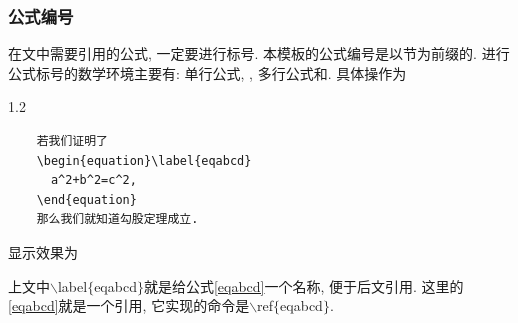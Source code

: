 \documentclass[a4paper,12pt,twoside]{ctexart}
\begin{document}
    \subsubsection{公式编号}
    在文中需要引用的公式, 一定要进行标号. 本模板的公式编号是以节为前缀的. 进行公式标号的数学环境主要有: 单行公式, , 多行公式和. 具体操作为
    \begin{spacing}{1.2}
    \begin{verbatim}
    若我们证明了
    \begin{equation}\label{eqabcd}
      a^2+b^2=c^2,
    \end{equation}
    那么我们就知道勾股定理成立.
    \end{verbatim}
    \end{spacing}\vspace*{-20pt}\noindent
    显示效果为\\[10pt]
    \medskip

    上文中$\backslash$label$\{$eqabcd$\}$就是给公式\ref{eqabcd}一个名称, 便于后文引用. 这里的\ref{eqabcd}就是一个引用, 它实现的命令是$\backslash$ref$\{$eqabcd$\}$.
\end{document}
